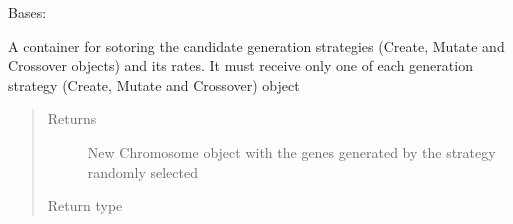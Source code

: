 \documentclass[letterpaper,10pt,english]{sphinxmanual}
\begin{document}
\begin{fulllineitems}
\label{\detokenize{MolOpt.genetic:MolOpt.genetic.genetic.Strategies}}
\sphinxAtStartPar
Bases: 

\sphinxAtStartPar
A container for sotoring the candidate generation strategies (Create, Mutate and Crossover objects) and its 
rates. It must receive only one of each generation strategy (Create, Mutate and Crossover) object
\begin{quote}\begin{description}
\item[{Returns}] \leavevmode
\sphinxAtStartPar
New Chromosome object with the genes generated by the strategy randomly selected

\item[{Return type}] \leavevmode
\sphinxAtStartPar
{\hyperref[\detokenize{MolOpt.genetic:MolOpt.genetic.genetic.Chromosome}]{}}

\end{description}\end{quote}

\end{fulllineitems}

\end{document}
